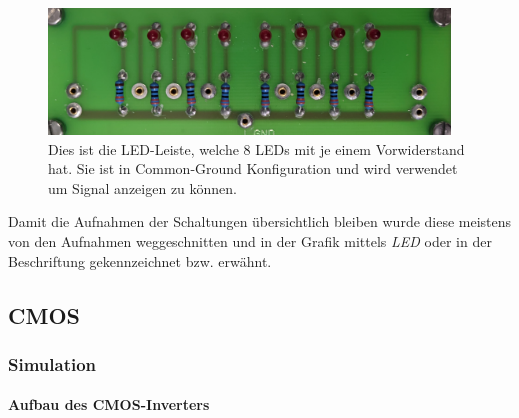 \documentclass[12pt,english,ngerman]{scrartcl}
\begin{document}
\begin{figure}[H]
  \centering
  \includegraphics[width=0.95\textwidth]{./figures/messungen/ledleiste.jpg}
  \caption{Dies ist die LED-Leiste, welche 8 LEDs mit je einem Vorwiderstand
  hat. Sie ist in Common-Ground Konfiguration und wird verwendet um Signal
  anzeigen zu können.}
  \label{fig:aufbau_led}
\end{figure}

Damit die Aufnahmen der Schaltungen übersichtlich bleiben wurde diese meistens
von den Aufnahmen weggeschnitten und in der Grafik mittels \textit{LED} oder in
der Beschriftung gekennzeichnet bzw. erwähnt.

\subsection{CMOS}
\subsubsection{Simulation}
\paragraph{Aufbau des CMOS-Inverters}


\begin{figure}[H]
  \centering
  \caption{}
  \label{fig:sim_aufbau_inv}
\end{figure}




\end{document}
